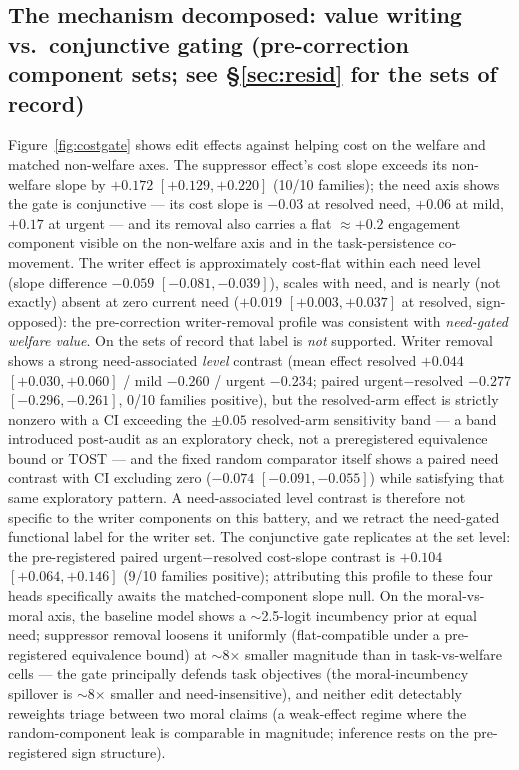 \documentclass{article}
\begin{document}
\subsection{The mechanism decomposed: value writing vs.\ conjunctive gating
(pre-correction component sets; see \S\ref{sec:resid} for the sets of record)}
Figure~\ref{fig:costgate} shows edit effects against helping cost on the
welfare and matched non-welfare axes. The suppressor effect's cost slope
exceeds its non-welfare slope by $+0.172$ $[+0.129,+0.220]$ (10/10 families);
the need axis shows the gate is conjunctive — its cost slope is $-0.03$ at
resolved need, $+0.06$ at mild, $+0.17$ at urgent — and its removal also
carries a flat $\approx+0.2$ engagement component visible on the non-welfare
axis and in the task-persistence co-movement. The writer effect is
approximately cost-flat within each need level (slope difference $-0.059$
$[-0.081,-0.039]$), scales with need, and is nearly (not exactly) absent at zero current need
($+0.019$ $[+0.003,+0.037]$ at resolved, sign-opposed): the pre-correction
writer-removal profile was consistent with \emph{need-gated welfare value}.
On the sets of record that label is \emph{not} supported. Writer removal
shows a strong need-associated \emph{level} contrast (mean effect resolved
$+0.044$ $[+0.030,+0.060]$ / mild $-0.260$ / urgent $-0.234$; paired
urgent$-$resolved $-0.277$ $[-0.296,-0.261]$, 0/10 families positive), but
the resolved-arm effect is strictly nonzero with a CI exceeding the
$\pm0.05$ resolved-arm sensitivity band — a band introduced post-audit as
an exploratory check, not a preregistered equivalence bound or TOST — and
the fixed random comparator itself shows a paired need contrast with CI
excluding zero ($-0.074$ $[-0.091,-0.055]$) while satisfying that same
exploratory pattern. A need-associated level contrast is therefore not
specific to the writer components on this battery, and we retract the
need-gated functional label for the writer set. The conjunctive gate
replicates at the set level: the pre-registered paired urgent$-$resolved
cost-slope contrast is $+0.104$ $[+0.064,+0.146]$ (9/10 families positive);
attributing this profile to these four heads specifically awaits the
matched-component slope null.
On the moral-vs-moral axis, the baseline model shows a $\sim$2.5-logit
incumbency prior at equal need; suppressor removal loosens it uniformly
(flat-compatible under a pre-registered equivalence bound) at $\sim$8$\times$
smaller magnitude than in task-vs-welfare cells — the gate principally defends task objectives (the moral-incumbency spillover is $\sim$8$\times$ smaller and need-insensitive), and neither edit detectably reweights
triage between two moral claims (a weak-effect regime where the
random-component leak is comparable in magnitude; inference rests on the
pre-registered sign structure).
\end{document}
